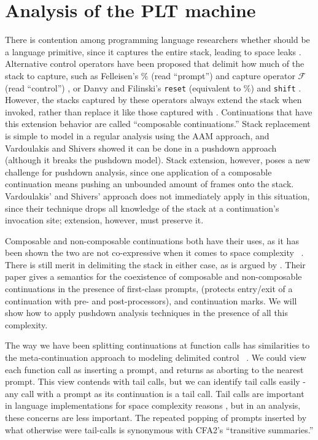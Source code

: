 \documentclass{llncs}
\newcommand{\Scribtexttt}[1]{{\texttt{#1}}}
\newcommand{\SColorize}[2]{\color{#1}{#2}}
\newcommand{\inColor}[2]{{\Scribtexttt{\SColorize{#1}{#2}}}}
\newcommand{\rackett}[1]{\inColor{black}{#1}}
\begin{document}
\section{Analysis of the PLT machine}
\label{sec:plt}

There is contention among programming language researchers whether
\rackett{call/cc} should be a language primitive, since it captures
the entire stack, leading to space leaks
\citep{ianjohnson:kiselyov:against-callcc}. Alternative control
operators have been proposed that delimit how much of the stack to
capture, such as Felleisen's $\%$ (read ``prompt'') and capture
operator ${\mathcal F}$ (read ``control'')
\citep{ianjohnson:felleisen:control:1988}, or Danvy and Filinski's
\texttt{reset} (equivalent to $\%$) and \texttt{shift}
\citep{ianjohnson:danvy:filinski:delim:1990}. However, the stacks
captured by these operators always extend the stack when invoked,
rather than replace it like those captured with
\rackett{call/cc}. Continuations that have this extension behavior are
called ``composable continuations.'' Stack replacement is simple to
model in a regular analysis using the AAM approach, and Vardoulakis
and Shivers showed it can be done in a pushdown approach (although it
breaks the pushdown model). Stack extension, however, poses a new
challenge for pushdown analysis, since one application of a composable
continuation means pushing an unbounded amount of frames onto the
stack. Vardoulakis' and Shivers' approach does not immediately apply
in this situation, since their technique drops all knowledge of the
stack at a continuation's invocation site; extension, however, must
preserve it.

Composable and non-composable continuations both have their uses, as
it has been shown the two are not co-expressive when it comes to space
complexity ~\citet{ianjohnson:dybvig:control:2007}. There is still
merit in delimiting the stack in either case, as is argued by
\citet{ianjohnson:Flatt:2007:ADC:1291151.1291178}. Their paper gives a
semantics for the coexistence of composable and non-composable
continuations in the presence of first-class prompts,
\rackett{dynamic-wind} (protects entry/exit of a continuation with
pre- and post-processors), and continuation marks. We will show how to
apply pushdown analysis techniques in the presence of all this
complexity.

The way we have been splitting continuations at function calls has
similarities to the meta-continuation approach to modeling delimited
control ~\citep{ianjohnson:Biernacki2006274}. We could view each
function call as inserting a prompt, and returns as aborting to the
nearest prompt. This view contends with tail calls, but we can
identify tail calls easily - any call with a prompt as its
continuation is a tail call. Tail calls are important in language
implementations for space complexity reasons
\citep{ianjohnson:clinger:tail-calls:1998}, but in an analysis, these
concerns are less important. The repeated popping of prompts inserted
by what otherwise were tail-calls is synonymous with CFA2's
``transitive summaries.''
\end{document}
